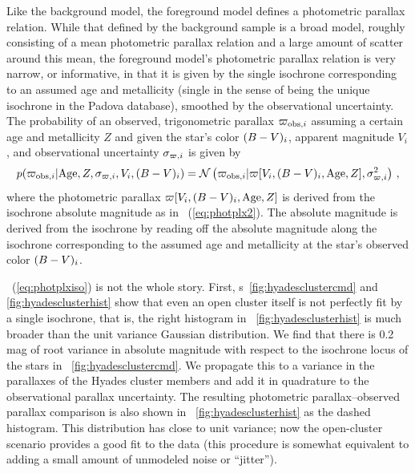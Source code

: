 Like the background model, the foreground model defines a photometric
parallax relation. While that defined by the background sample is a
broad model, roughly consisting of a mean photometric parallax
relation and a large amount of scatter around this mean, the
foreground model's photometric parallax relation is very narrow, or
informative, in that it is given by the single isochrone corresponding
to an assumed age and metallicity (single in the sense of being the
unique isochrone in the Padova database), smoothed by the
observational uncertainty. The probability of an observed,
trigonometric parallax $\varpi_{\mathrm{obs},i}$ assuming a certain
age and metallicity $Z$ and given the star's color $(B-V)_i$,
apparent magnitude $V_i$, and observational uncertainty
$\sigma_{\varpi,i}$ is given by
\begin{equation}\label{eq:photplxiso}
p(\varpi_{\mathrm{obs},i} | \mathrm{Age},Z,\sigma_{\varpi,i},V_i,(B-V)_i)
= \mathcal{N} \left(\varpi_{\mathrm{obs},i}|\varpi[V_i,(B-V)_i,\mathrm{Age},Z],\sigma_{\varpi,i}^2\right)\,,
\end{equation}
where the photometric parallax
$\varpi[V_i,(B-V)_i,\mathrm{Age},Z]$ is derived from the
isochrone absolute magnitude as in \eqnname~(\ref{eq:photplx2}). The
absolute magnitude is derived from the isochrone by reading off the
absolute magnitude along the isochrone corresponding to the assumed
age and metallicity at the star's observed color $(B-V)_i$.

\Eqnname~(\ref{eq:photplxiso}) is not the whole story. First,
\figurename s~\ref{fig:hyadesclustercmd} and
\ref{fig:hyadesclusterhist} show that even an open cluster itself is
not perfectly fit by a single isochrone, that is, the right histogram
in \figurename~\ref{fig:hyadesclusterhist} is much broader than the
unit variance Gaussian distribution. We find that there is 0.2 mag of
root variance in absolute magnitude with respect to the isochrone
locus of the stars in \figurename~\ref{fig:hyadesclustercmd}. We
propagate this to a variance in the parallaxes of the Hyades cluster
members and add it in quadrature to the observational parallax
uncertainty. The resulting photometric parallax--observed parallax
comparison is also shown in \figurename~\ref{fig:hyadesclusterhist} as
the dashed histogram. This distribution has close to unit variance;
now the open-cluster scenario provides a good fit to the data (this
procedure is somewhat equivalent to adding a small amount of unmodeled
noise or ``jitter'').

